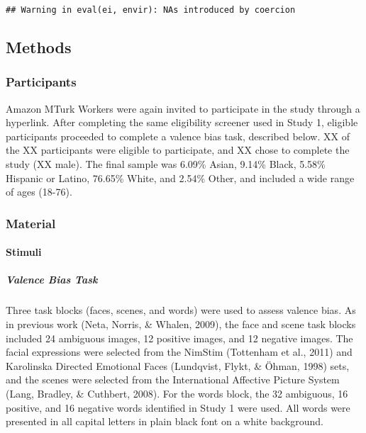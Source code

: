 \documentclass[man]{apa6}
\let\oldparagraph\paragraph
\renewcommand{\paragraph}[1]{\oldparagraph{#1}\mbox{}}
\let\oldsubparagraph\subparagraph
\renewcommand{\subparagraph}[1]{\oldsubparagraph{#1}\mbox{}}
\begin{document}
\begin{verbatim}
## Warning in eval(ei, envir): NAs introduced by coercion
\end{verbatim}

\hypertarget{methods-1}{%
\subsection{Methods}\label{methods-1}}

\hypertarget{participants-1}{%
\subsubsection{Participants}\label{participants-1}}

Amazon MTurk Workers were again invited to participate in the study through a hyperlink. After completing the same eligibility screener used in Study 1, eligible participants proceeded to complete a valence bias task, described below. XX of the XX participants were eligible to participate, and XX chose to complete the study (XX male). The final sample was 6.09\% Asian, 9.14\% Black, 5.58\% Hispanic or Latino, 76.65\% White, and 2.54\% Other, and included a wide range of ages (18-76).

\hypertarget{material-1}{%
\subsubsection{Material}\label{material-1}}

\hypertarget{stimuli-1}{%
\paragraph{Stimuli}\label{stimuli-1}}

\hypertarget{valence-bias-task}{%
\subparagraph{Valence Bias Task}\label{valence-bias-task}}

Three task blocks (faces, scenes, and words) were used to assess valence bias. As in previous work (Neta, Norris, \& Whalen, 2009), the face and scene task blocks included 24 ambiguous images, 12 positive images, and 12 negative images. The facial expressions were selected from the NimStim (Tottenham et al., 2011) and Karolinska Directed Emotional Faces (Lundqvist, Flykt, \& Öhman, 1998) sets, and the scenes were selected from the International Affective Picture System (Lang, Bradley, \& Cuthbert, 2008). For the words block, the 32 ambiguous, 16 positive, and 16 negative words identified in Study 1 were used. All words were presented in all capital letters in plain black font on a white background.
\end{document}
